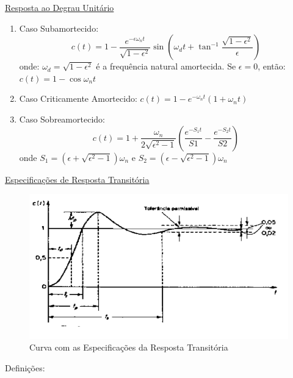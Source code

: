 \hspace{4ex} \underline{Resposta ao Degrau Unitário}

\begin{enumerate}
    \item Caso Subamortecido: 
        \[c(t)=1-\frac{e^{-\epsilon\omega_n t}}{\sqrt{1-\epsilon^2}}\sin(\omega_d t+\tan^{-1}\frac{\sqrt{1-\epsilon^2}}{\epsilon})\]
onde: \(\omega_d=\sqrt{1-\epsilon^2}\) é a frequência natural amortecida.
\newline
Se \(\epsilon=0\), então: \(c(t)=1-\cos\omega_n t\)

    \item Caso Criticamente Amortecido: \(c(t)=1-e^{-\omega_n t}(1+\omega_n t)\)

    \item Caso Sobreamortecido: 
    \[c(t)=1+\frac{\omega_n}{2\sqrt{\epsilon^2 -1}}(\frac{e^{-S_1 t}}{S1}-\frac{e^{-S_2 t}}{S2})\]
onde \(S_1=(\epsilon+\sqrt{\epsilon^2 -1})\omega_n\) e \(S_2=(\epsilon-\sqrt{\epsilon^2 -1})\omega_n\)
\newline
\end{enumerate}

\hspace{4ex} \underline{Especificações de Resposta Transitória}

\begin{figure}[h]
    \centering
    \includegraphics[width=15cm]{images/roteiro b/img ref teorico/curva.PNG}
    \caption{Curva com as Especificações da Resposta Transitória}
    \label{fig:curva}
\end{figure}

\hspace{4ex}Definições:

